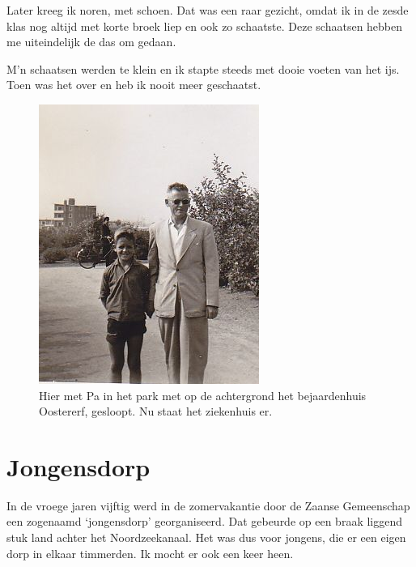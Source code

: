 \documentclass[12pt,twoside]{memoir}
\newlength{\drop}%
\begin{document}
Later kreeg ik noren, met schoen. Dat was een raar gezicht, omdat ik in de zesde klas nog altijd met korte broek liep en ook zo schaatste. Deze schaatsen hebben me uiteindelijk de das om gedaan. 

M’n schaatsen werden te klein en ik stapte steeds met dooie voeten van het ijs. Toen was het over en heb ik nooit meer geschaatst. 

\begin{figure}
\includegraphics[width=\textwidth]{img/ch13/metpa2}
\caption*{\footnotesize Hier met Pa in het park met op de achtergrond het bejaardenhuis Oostererf, gesloopt. Nu staat het ziekenhuis er.}
\end{figure}

\chapter{Jongensdorp} %
\label{cha:jongensdrop}

In de vroege jaren vijftig werd in de zomervakantie door de Zaanse Gemeenschap een zogenaamd `jongensdorp' georganiseerd. Dat gebeurde op een braak liggend stuk land achter het Noordzeekanaal. Het was dus voor jongens, die er een eigen dorp in elkaar timmerden. Ik mocht er ook een keer heen. 
\end{document}
